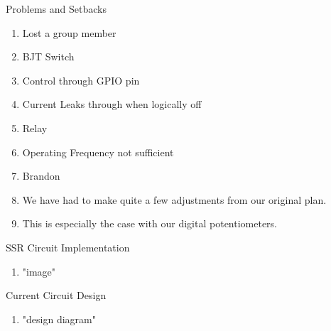 \begin{frame}{Problems and Setbacks}
  \begin{enumerate}
    \item Lost a group member
    \item BJT Switch
    \item Control through GPIO pin
    \item Current Leaks through when logically off
    \item Relay
    \item Operating Frequency not sufficient
    \item Brandon
    \item We have had to make quite a few adjustments from our original plan.
    \item This is especially the case with our digital potentiometers.
  \end{enumerate}
\end{frame}

\begin{frame}{SSR Circuit Implementation}
  \begin{enumerate}
    \item "image"
  \end{enumerate}
\end{frame}


\begin{frame}{Current Circuit Design}
  \begin{enumerate}
    \item "design diagram"
  \end{enumerate}
\end{frame}

